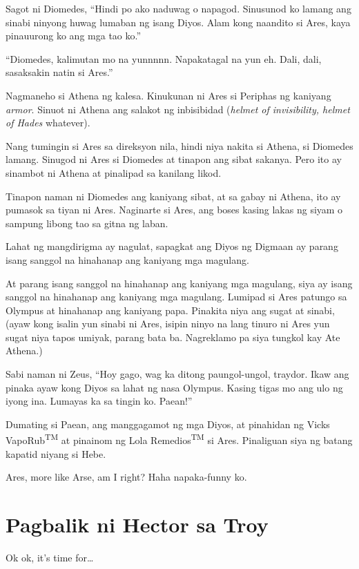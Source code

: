 \documentclass[12pt,letterpaper]{report}
\begin{document}
Sagot ni Diomedes, ``Hindi po ako naduwag o napagod. Sinusunod ko lamang ang sinabi ninyong huwag lumaban ng isang Diyos. Alam kong naandito si Ares, kaya pinauurong ko ang mga tao ko.''

``Diomedes, kalimutan mo na yunnnnn. Napakatagal na yun eh. Dali, dali, sasaksakin natin si Ares.''

Nagmaneho si Athena ng kalesa. Kinukunan ni Ares si Periphas ng kaniyang \textit{armor}. Sinuot ni Athena ang salakot ng inbisibidad (\textit{helmet of invisibility, helmet of Hades} whatever).

Nang tumingin si Ares sa direksyon nila, hindi niya nakita si Athena, si Diomedes lamang. Sinugod ni Ares si Diomedes at tinapon ang sibat sakanya. Pero ito ay sinambot ni Athena at pinalipad sa kanilang likod.

Tinapon naman ni Diomedes ang kaniyang sibat, at sa gabay ni Athena, ito ay pumasok sa tiyan ni Ares. Naginarte si Ares, ang boses kasing lakas ng siyam o sampung libong tao sa gitna ng laban.

Lahat ng mangdirigma ay nagulat, sapagkat ang Diyos ng Digmaan ay parang isang sanggol na hinahanap ang kaniyang mga magulang.

At parang isang sanggol na hinahanap ang kaniyang mga magulang, siya ay isang sanggol na hinahanap ang kaniyang mga magulang. Lumipad si Ares patungo sa Olympus at hinahanap ang kaniyang papa. Pinakita niya ang sugat at sinabi, (ayaw kong isalin yun sinabi ni Ares, isipin ninyo na lang tinuro ni Ares yun sugat niya tapos umiyak, parang bata ba. Nagreklamo pa siya tungkol kay Ate Athena.)

Sabi naman ni Zeus, ``Hoy gago, wag ka ditong paungol-ungol, traydor. Ikaw ang pinaka ayaw kong Diyos sa lahat ng nasa Olympus. Kasing tigas mo ang ulo ng iyong ina. Lumayas ka sa tingin ko. Paean!''

Dumating si Paean, ang manggagamot ng mga Diyos, at pinahidan ng Vicks VapoRub\textsuperscript{TM} at pinainom ng Lola Remedios\textsuperscript{TM} si Ares. Pinaliguan siya ng batang kapatid niyang si Hebe.

Ares, more like Arse, am I right? Haha napaka-funny ko. \pagebreak
\chapter{Pagbalik ni Hector sa Troy}

Ok ok, it's time for\dots
\end{document}
